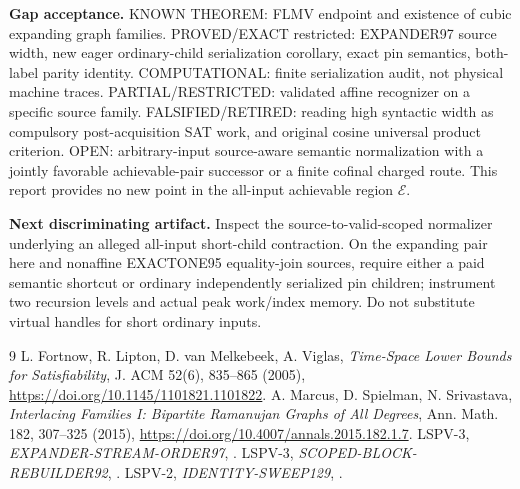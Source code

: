 \documentclass[11pt]{article}
\begin{document}
\textbf{Gap acceptance.} KNOWN THEOREM: FLMV endpoint and existence of cubic expanding graph families. PROVED/EXACT restricted: EXPANDER97 source width, new eager ordinary-child serialization corollary, exact pin semantics, both-label parity identity. COMPUTATIONAL: finite serialization audit, not physical machine traces. PARTIAL/RESTRICTED: validated affine recognizer on a specific source family. FALSIFIED/RETIRED: reading high syntactic width as compulsory post-acquisition SAT work, and original cosine universal product criterion. OPEN: arbitrary-input source-aware semantic normalization with a jointly favorable achievable-pair successor or a finite cofinal charged route. This report provides no new point in the all-input achievable region $\mathcal E$.

\textbf{Next discriminating artifact.} Inspect the source-to-valid-scoped normalizer underlying an alleged all-input short-child contraction. On the expanding pair here and nonaffine EXACTONE95 equality-join sources, require either a paid semantic shortcut or ordinary independently serialized pin children; instrument two recursion levels and actual peak work/index memory. Do not substitute virtual handles for short ordinary inputs.

\begin{thebibliography}{9}
 L. Fortnow, R. Lipton, D. van Melkebeek, A. Viglas, \emph{Time-Space Lower Bounds for Satisfiability}, J. ACM 52(6), 835--865 (2005), \url{https://doi.org/10.1145/1101821.1101822}.
 A. Marcus, D. Spielman, N. Srivastava, \emph{Interlacing Families I: Bipartite Ramanujan Graphs of All Degrees}, Ann. Math. 182, 307--325 (2015), \url{https://doi.org/10.4007/annals.2015.182.1.7}.
 LSPV-3, \emph{EXPANDER-STREAM-ORDER97}, .
 LSPV-3, \emph{SCOPED-BLOCK-REBUILDER92}, .
 LSPV-2, \emph{IDENTITY-SWEEP129}, .
\end{thebibliography}
\end{document}
